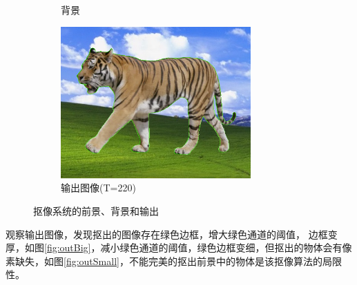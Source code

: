 \documentclass[UTF8]{article}
\begin{document}
\begin{figure}[htbp]
\begin{subfigure}{0.33\textwidth}
      \caption{背景}
      \label{fig:bg} %
    \end{subfigure}
    \begin{subfigure}{0.33\textwidth}
        \centering
        \includegraphics[width=0.8\textwidth]{img/output_img.png}
        \caption{输出图像(T=220)}
        \label{fig:output} %
    \end{subfigure}
    \caption{抠像系统的前景、背景和输出}
    \label{fig:前后} %
\end{figure}
观察输出图像，发现抠出的图像存在绿色边框，增大绿色通道的阈值，
边框变厚，如图\ref{fig:outBig}，减小绿色通道的阈值，绿色边框变细，但抠出的物体会有像素缺失，如图\ref{fig:outSmall}，不能完美的抠出前景中的物体是该抠像算法的局限性。
\end{document}
